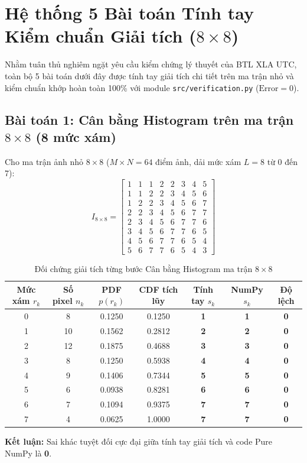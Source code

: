 \section{Hệ thống 5 Bài toán Tính tay Kiểm chuẩn Giải tích ($8 \times 8$)}
\label{sec:hand_calc}
Nhằm tuân thủ nghiêm ngặt yêu cầu kiểm chứng lý thuyết của BTL XLA UTC, toàn bộ 5 bài toán dưới đây được tính tay giải tích chi tiết trên ma trận nhỏ và kiểm chuẩn khớp hoàn toàn 100\% với module \texttt{src/verification.py} ($\text{Error} = 0$).

\subsection{Bài toán 1: Cân bằng Histogram trên ma trận $8 \times 8$ (8 mức xám)}
Cho ma trận ảnh nhỏ $8 \times 8$ ($M \times N = 64$ điểm ảnh, dải mức xám $L = 8$ từ 0 đến 7):
\begin{equation*}
I_{8 \times 8} = \begin{bmatrix}
1 & 1 & 1 & 2 & 2 & 3 & 4 & 5 \\
1 & 1 & 2 & 2 & 3 & 4 & 5 & 6 \\
1 & 2 & 2 & 3 & 4 & 5 & 6 & 7 \\
2 & 2 & 3 & 4 & 5 & 6 & 7 & 7 \\
2 & 3 & 4 & 5 & 6 & 7 & 7 & 6 \\
3 & 4 & 5 & 6 & 7 & 7 & 6 & 5 \\
4 & 5 & 6 & 7 & 7 & 6 & 5 & 4 \\
5 & 6 & 7 & 7 & 6 & 5 & 4 & 3
\end{bmatrix}
\end{equation*}

\begin{table}[H]
\centering
\small
\begin{tabular}{|c|c|c|c|c|c|c|}
\hline
\textbf{Mức xám $r_k$} & \textbf{Số pixel $n_k$} & \textbf{PDF $p(r_k)$} & \textbf{CDF tích lũy} & \textbf{Tính tay $s_k$} & \textbf{NumPy $s_k$} & \textbf{Độ lệch} \\
\hline
0 & 8 & 0.1250 & 0.1250 & \textbf{1} & \textbf{1} & \textbf{0} \\
1 & 10 & 0.1562 & 0.2812 & \textbf{2} & \textbf{2} & \textbf{0} \\
2 & 12 & 0.1875 & 0.4688 & \textbf{3} & \textbf{3} & \textbf{0} \\
3 & 8 & 0.1250 & 0.5938 & \textbf{4} & \textbf{4} & \textbf{0} \\
4 & 9 & 0.1406 & 0.7344 & \textbf{5} & \textbf{5} & \textbf{0} \\
5 & 6 & 0.0938 & 0.8281 & \textbf{6} & \textbf{6} & \textbf{0} \\
6 & 7 & 0.1094 & 0.9375 & \textbf{7} & \textbf{7} & \textbf{0} \\
7 & 4 & 0.0625 & 1.0000 & \textbf{7} & \textbf{7} & \textbf{0} \\
\hline
\end{tabular}
\caption{Đối chứng giải tích từng bước Cân bằng Histogram ma trận $8 \times 8$}
\label{tab:calc_he}
\end{table}
\noindent \textbf{Kết luận:} Sai khác tuyệt đối cực đại giữa tính tay giải tích và code Pure NumPy là \textbf{0}.

